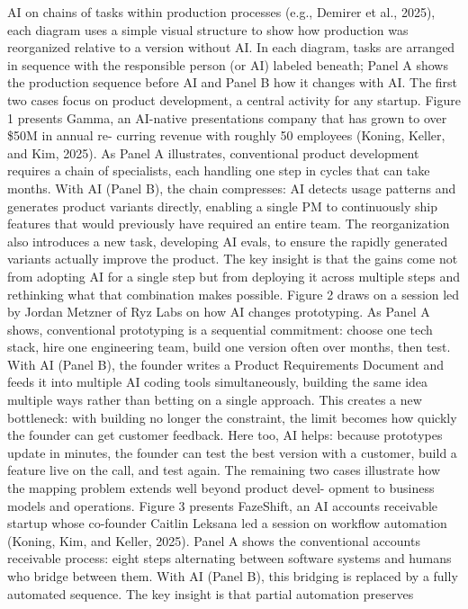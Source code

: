 AI on chains of tasks within production processes (e.g., Demirer et al., 2025), each diagram uses a
simple visual structure to show how production was reorganized relative to a version without AI. In
each diagram, tasks are arranged in sequence with the responsible person (or AI) labeled beneath;
Panel A shows the production sequence before AI and Panel B how it changes with AI.
The first two cases focus on product development, a central activity for any startup. Figure 1
presents Gamma, an AI-native presentations company that has grown to over \$50M in annual re-
curring revenue with roughly 50 employees (Koning, Keller, and Kim, 2025). As Panel A illustrates,
conventional product development requires a chain of specialists, each handling one step in cycles
that can take months. With AI (Panel B), the chain compresses: AI detects usage patterns and
generates product variants directly, enabling a single PM to continuously ship features that would
previously have required an entire team. The reorganization also introduces a new task, developing
AI evals, to ensure the rapidly generated variants actually improve the product. The key insight is
that the gains come not from adopting AI for a single step but from deploying it across multiple
steps and rethinking what that combination makes possible.
Figure 2 draws on a session led by Jordan Metzner of Ryz Labs on how AI changes prototyping.
As Panel A shows, conventional prototyping is a sequential commitment: choose one tech stack,
hire one engineering team, build one version often over months, then test. With AI (Panel B),
the founder writes a Product Requirements Document and feeds it into multiple AI coding tools
simultaneously, building the same idea multiple ways rather than betting on a single approach. This
creates a new bottleneck: with building no longer the constraint, the limit becomes how quickly the
founder can get customer feedback. Here too, AI helps: because prototypes update in minutes, the
founder can test the best version with a customer, build a feature live on the call, and test again.
The remaining two cases illustrate how the mapping problem extends well beyond product devel-
opment to business models and operations. Figure 3 presents FazeShift, an AI accounts receivable
startup whose co-founder Caitlin Leksana led a session on workflow automation (Koning, Kim, and
Keller, 2025). Panel A shows the conventional accounts receivable process: eight steps alternating
between software systems and humans who bridge between them. With AI (Panel B), this bridging
is replaced by a fully automated sequence. The key insight is that partial automation preserves
